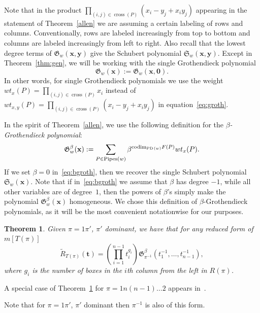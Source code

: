\documentclass[10pt]{amsart}
\newtheorem{theo}{Theorem}[section]
\theoremstyle{definition}
\numberwithin{equation}{section}
\DeclareMathOperator{\Pipes}{Pipes}
\DeclareMathOperator{\cross}{cross}
\newcommand*\+{\smash{\lower2pt\hbox{\rlap{\vrule height14pt}}\raise2pt\hbox{\rlap{\hskip-3pt \vrule height.4pt depth0pt width14.7pt}}}}
\newcommand*{\MK}{\mkern 2mu}
\DeclareMathOperator{\PD}{\textit{PD}\MK}
\begin{document}
Note that in the product $\prod_{(i,j) \in \cross(P)} (x_i-y_j+x_iy_j)$ appearing in the statement of Theorem~\ref{allen} we are assuming a certain labeling of rows and columns. Conventionally, rows are labeled increasingly from top to bottom and columns are labeled increasingly from left to right. Also recall that the lowest degree terms of $\mathfrak{G}_w(\mathbf{x, y})$ give the Schubert polynomial $\mathfrak{S}_w(\mathbf{x, y})$. Except in Theorem~\ref{thm:gen}, we will be working with the single Grothendieck polynomial
\[
\mathfrak{G}_w(\mathbf{x}):=\mathfrak{G}_w(\mathbf{x, 0}).
\]
In other words, for single Grothendieck polynomials we use the weight $wt_{x}(P)=\prod_{(i,j) \in \cross(P)} x_i$ instead of $wt_{x,y}(P)=\prod_{(i,j) \in \cross(P)} (x_i-y_j+x_iy_j)$ in equation~\eqref{eq:groth}.


In the spirit of Theorem~\ref{allen}, we use the following definition for the \emph{$\beta$-Grothendieck polynomial}:
\begin{equation}
\mathfrak{G}^{\beta}_w(\mathbf{x}):=\sum_{P\in \Pipes(w)}\beta^{\mathrm{codim}_{\PD(w)}F(P)} wt_{x}(P).\label{eq:bgroth}
\end{equation}
If we set $\beta=0$ in~\eqref{eq:bgroth}, then we recover the single Schubert polynomial $\mathfrak{S}_w(\mathbf{x})$. Note that if in~\eqref{eq:bgroth} we assume that $\beta$ has degree $-1$, while all other variables are of degree~$1$, then the powers of $\beta$'s simply make the polynomial $ \mathfrak{G}_w^{\beta}(\mathbf{x})$ homogeneous. We chose this definition of $\beta$-Grothendieck polynomials, as it will be the most convenient notationwise for our purposes.

\begin{theo}\label{thm:t}
Given $\pi=1\pi'$, $\pi'$ dominant, we have that for any reduced form of $m[T(\pi)]$
\begin{equation}
\tilde{R}_{T(\pi)}(\mathbf{t})=\left(\prod_{i=1}^{n-1} t_i^{g_i}\right) \mathfrak{G}_{{\pi}^{-1}}^{\beta}(t_1^{-1}, \dots, t_{n-1}^{-1}),
\end{equation}
where $g_i$ is the number of boxes in the $i$th column from the left in $R(\pi)$.
\end{theo}

A special case of Theorem~\ref{thm:t} for $\pi=1n(n-1)\dots 2$ appears in~\cite{k2014}.

Note that for $\pi=1\pi'$, $\pi'$ dominant then $\pi^{-1}$ is also of this form.
\end{document}
